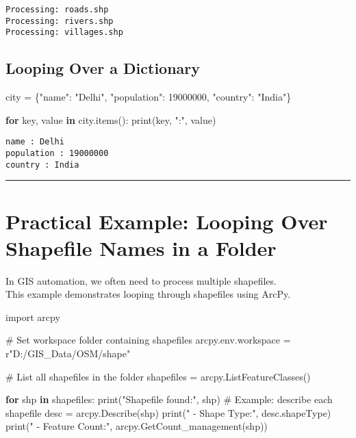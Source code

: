 \documentclass[
  11pt,
  letterpaper,
]{book}
\newenvironment{Shaded}{\begin{snugshade}}{\end{snugshade}}
\newcommand{\BuiltInTok}[1]{\textcolor[rgb]{0.00,0.23,0.31}{#1}}
\newcommand{\CommentTok}[1]{\textcolor[rgb]{0.37,0.37,0.37}{#1}}
\newcommand{\ControlFlowTok}[1]{\textcolor[rgb]{0.00,0.23,0.31}{\textbf{#1}}}
\newcommand{\DecValTok}[1]{\textcolor[rgb]{0.68,0.00,0.00}{#1}}
\newcommand{\ImportTok}[1]{\textcolor[rgb]{0.00,0.46,0.62}{#1}}
\newcommand{\KeywordTok}[1]{\textcolor[rgb]{0.00,0.23,0.31}{\textbf{#1}}}
\newcommand{\NormalTok}[1]{\textcolor[rgb]{0.00,0.23,0.31}{#1}}
\newcommand{\OperatorTok}[1]{\textcolor[rgb]{0.37,0.37,0.37}{#1}}
\newcommand{\StringTok}[1]{\textcolor[rgb]{0.13,0.47,0.30}{#1}}
\newcommand{\VerbatimStringTok}[1]{\textcolor[rgb]{0.13,0.47,0.30}{#1}}
\begin{document}
\begin{verbatim}
Processing: roads.shp
Processing: rivers.shp
Processing: villages.shp
\end{verbatim}

\subsection{Looping Over a Dictionary}\label{looping-over-a-dictionary}

\begin{Shaded}
\begin{Highlighting}[]
\NormalTok{city }\OperatorTok{=}\NormalTok{ \{}\StringTok{"name"}\NormalTok{: }\StringTok{"Delhi"}\NormalTok{, }\StringTok{"population"}\NormalTok{: }\DecValTok{19000000}\NormalTok{, }\StringTok{"country"}\NormalTok{: }\StringTok{"India"}\NormalTok{\}}

\ControlFlowTok{for}\NormalTok{ key, value }\KeywordTok{in}\NormalTok{ city.items():}
    \BuiltInTok{print}\NormalTok{(key, }\StringTok{":"}\NormalTok{, value)}
\end{Highlighting}
\end{Shaded}

\begin{verbatim}
name : Delhi
population : 19000000
country : India
\end{verbatim}

\begin{center}\rule{0.5\linewidth}{0.5pt}\end{center}

\section{Practical Example: Looping Over Shapefile Names in a
Folder}\label{practical-example-looping-over-shapefile-names-in-a-folder}

In GIS automation, we often need to process multiple shapefiles.\\
This example demonstrates looping through shapefiles using ArcPy.

\begin{Shaded}
\begin{Highlighting}[]
\ImportTok{import}\NormalTok{ arcpy}

\CommentTok{\# Set workspace folder containing shapefiles}
\NormalTok{arcpy.env.workspace }\OperatorTok{=} \VerbatimStringTok{r"D:/GIS\_Data/OSM/shape"}

\CommentTok{\# List all shapefiles in the folder}
\NormalTok{shapefiles }\OperatorTok{=}\NormalTok{ arcpy.ListFeatureClasses()}

\ControlFlowTok{for}\NormalTok{ shp }\KeywordTok{in}\NormalTok{ shapefiles:}
    \BuiltInTok{print}\NormalTok{(}\StringTok{"Shapefile found:"}\NormalTok{, shp)}
    \CommentTok{\# Example: describe each shapefile}
\NormalTok{    desc }\OperatorTok{=}\NormalTok{ arcpy.Describe(shp)}
    \BuiltInTok{print}\NormalTok{(}\StringTok{" {-} Shape Type:"}\NormalTok{, desc.shapeType)}
    \BuiltInTok{print}\NormalTok{(}\StringTok{" {-} Feature Count:"}\NormalTok{, arcpy.GetCount\_management(shp))}
\end{Highlighting}
\end{Shaded}
\end{document}
